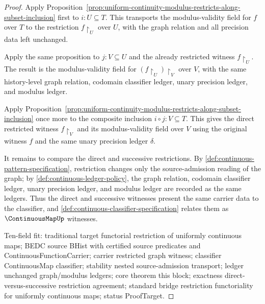 \begin{proof}
Apply Proposition~\ref{prop:uniform-continuity-modulus-restricts-along-subset-inclusion} first to $i:U\subseteq T$. This transports the modulus-validity field for $f$ over $T$ to the restriction $f\!\restriction_U$ over $U$, with the graph relation and all precision data left unchanged.

Apply the same proposition to $j:V\subseteq U$ and the already restricted witness $f\!\restriction_U$. The result is the modulus-validity field for $(f\!\restriction_U)\!\restriction_V$ over $V$, with the same history-level graph relation, codomain classifier ledger, unary precision ledger, and modulus ledger.

Apply Proposition~\ref{prop:uniform-continuity-modulus-restricts-along-subset-inclusion} once more to the composite inclusion $i\circ j:V\subseteq T$. This gives the direct restricted witness $f\!\restriction_V$ and its modulus-validity field over $V$ using the original witness $f$ and the same unary precision ledger $\delta$.

It remains to compare the direct and successive restrictions. By \autoref{def:continuous-pattern-specification}, restriction changes only the source-admission reading of the graph; by \autoref{def:continuous-ledger-policy}, the graph relation, codomain classifier ledger, unary precision ledger, and modulus ledger are recorded as the same ledgers. Thus the direct and successive witnesses present the same carrier data to the classifier, and \autoref{def:continuous-classifier-specification} relates them as $\ContinuousMapUp$ witnesses.

Ten-field fit: traditional target functorial restriction of uniformly continuous maps; BEDC source BHist with certified source predicates and ContinuousFunctionCarrier; carrier restricted graph witness; classifier ContinuousMap classifier; stability nested source-admission transport; ledger unchanged graph/modulus ledgers; core theorem this block; exactness direct-versus-successive restriction agreement; standard bridge restriction functoriality for uniformly continuous maps; status ProofTarget.
\end{proof}

